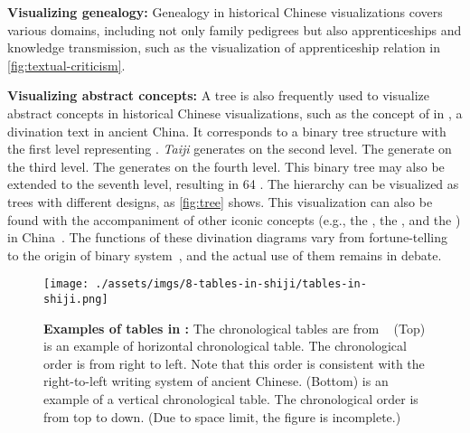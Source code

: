 \textbf{Visualizing genealogy:}
Genealogy in historical Chinese visualizations covers various domains, including not only family pedigrees but also apprenticeships and knowledge transmission, such as the visualization of apprenticeship relation in \cref{fig:textual-criticism}.

\textbf{Visualizing abstract concepts:}
A tree is also frequently used to visualize abstract concepts in historical Chinese visualizations, such as the concept of  in , a divination text in ancient China.
It corresponds to a binary tree structure with the first level representing .
\emph{Taiji} generates  on the second level.
The  generate  on the third level.
The  generates  on the fourth level.
This binary tree may also be extended to the seventh level, resulting in 64 .
The hierarchy can be visualized as trees with different designs, as \cref{fig:tree} shows.
This visualization can also be found with the accompaniment of other iconic concepts (e.g., the , the , and the ) in China~\cite{Kalinowski2007Time}.
The functions of these divination diagrams vary from fortune-telling to the origin of binary system~\cite{Cammann1991Chinese}, and the actual use of them remains in debate.


\begin{figure*}[!htb]
    \centering
    \texttt{[image: ./assets/imgs/8-tables-in-shiji/tables-in-shiji.png]}
    \caption{
        \textbf{Examples of tables in \datasetName:}
        The chronological tables are from  \term{\Shiji}~\cite{Si1550Shi}
        (Top)  is an example of horizontal chronological table.
        The chronological order is from right to left.
        Note that this order is consistent with the right-to-left writing system of ancient Chinese.
        (Bottom)  is an example of a vertical chronological table.
        The chronological order is from top to down.
        (Due to space limit, the figure is incomplete.)
    }
    \label{fig:tables-in-shiji}
\end{figure*}

